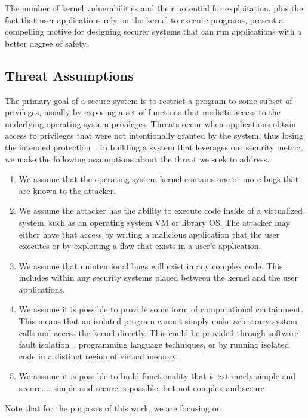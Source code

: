 The number of kernel vulnerabilities and their potential for exploitation, 
plus the fact that user applications rely on the kernel to execute
programs, 
present a compelling motive for designing securer systems that can run
applications with a better degree of safety.

\subsection{Threat Assumptions}

The primary goal of a secure system is to restrict a program to some subset
of privileges, 
usually by exposing a set of functions that mediate access to the
underlying operating system privileges. 
Threats occur when applications obtain access to privileges that were not
intentionally granted by the system, 
thus losing the intended protection~\cite{Repy-10}. In building a system
that leverages our security metric, 
we make the following assumptions about the threat we seek to address.

\begin{enumerate}
\item We assume that the operating system kernel contains one or more bugs 
that are known to the attacker.

\item We assume the attacker has the ability to execute code inside
of a virtualized system, such as an operating system VM or library OS.
The attacker may either have that access by writing a malicious application
that the user executes or by exploiting a flaw that exists in a user's
application.


\item We assume that unintentional bugs will exist in any complex code.  This
includes within any security systems placed between the kernel and the user
applications.

\item We assume it is possible to provide some form of computational 
containment.  This means that an isolated program cannot simply
make arbritrary system calls and access the kernel directly.  This could
be provided through software-fault isolation~, programming 
language techniques, or by running isolated code in a
distinct region of virtual memory.

\item We assume it is possible to build functionality that is extremely
simple and secure....
simple and secure is possible, but not complex and secure.

\end{enumerate}

Note that for the purposes of this work, we are focusing on 
